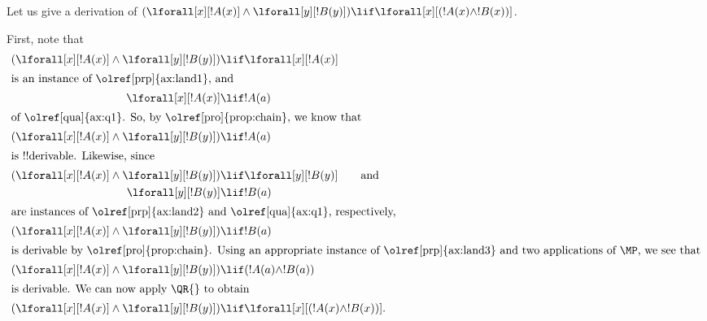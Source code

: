 \documentclass[../../../include/open-logic-section]{subfiles}
\begin{document}

\begin{ex}
Let us give a derivation of $(\lforall[x][!A(x)] \land
\lforall[y][!B(y)]) \lif \lforall[x][(!A(x) \land !B(x))]$.

First, note that
\begin{align*}
  (\lforall[x][!A(x)] \land \lforall[y][!B(y)]) & \lif \lforall[x][!A(x)]\\
  \intertext{is an instance of \olref[prp]{ax:land1}, and}
  \lforall[x][!A(x)] & \lif !A(a) \\
  \intertext{of \olref[qua]{ax:q1}. So, by \olref[pro]{prop:chain}, we know that}
  (\lforall[x][!A(x)] \land \lforall[y][!B(y)]) & \lif !A(a) \\
  \intertext{is !!{derivable}. Likewise, since}
  (\lforall[x][!A(x)] \land \lforall[y][!B(y)]) & \lif \lforall[y][!B(y)] \qquad\text{and}\\
    \lforall[y][!B(y)] & \lif !B(a)\\
    \intertext{are instances of \olref[prp]{ax:land2} and \olref[qua]{ax:q1}, respectively,}
    (\lforall[x][!A(x)] \land \lforall[y][!B(y)]) & \lif !B(a)\\
    \intertext{is derivable by \olref[pro]{prop:chain}. Using an appropriate instance of \olref[prp]{ax:land3} and two applications of~\MP, we see that}
    (\lforall[x][!A(x)] \land \lforall[y][!B(y)]) & \lif (!A(a) \land !B(a))\\
    \intertext{is derivable. We can now apply \QR{} to obtain}
(\lforall[x][!A(x)] \land \lforall[y][!B(y)]) & \lif \lforall[x][(!A(x) \land !B(x))].
\end{align*}
\end{ex}
\end{document}

